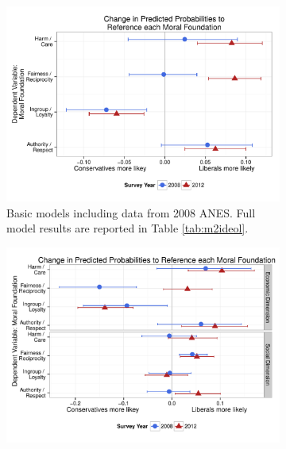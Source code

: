 \documentclass[12pt]{article}
\begin{document}
\begin{figure}[h]
  \centering
  \caption{Difference in predicted probabilities to reference each moral foundation between liberals and conservatives, holding all other control variables at their respective means (along with 95\% confidence intervals). Positive values indicate that liberals are more likely to reference the respective moral foundations than conservatives, and vice versa. Estimates are based on individual logit models for each foundation.}
  \begin{subfigure}[t]{0.49\textwidth}
    \includegraphics[scale=.4]{../calc/fig/appD1ideol.pdf}
    \caption{Basic models including data from 2008 ANES. Full model results are reported in Table \ref{tab:m2ideol}.}\label{fig:appD1ideol}
  \end{subfigure}
  \begin{subfigure}[t]{0.49\textwidth}
    \includegraphics[scale=.4]{../calc/fig/appD2soceco.pdf}

\end{subfigure}
\end{figure}
\end{document}
